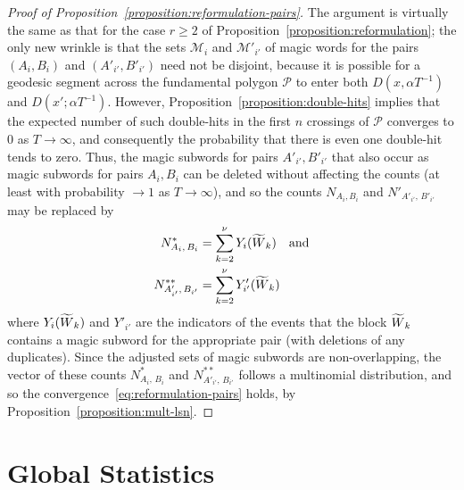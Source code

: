\documentclass[10pt]{amsart}
\theoremstyle{definition}\newtheorem{defi}[theo]{Definition}\newtheorem{rema}[theo]{Remark}\newtheorem{exam}[theo]{Example}\newtheorem{exem}[theo]{Example}\newtheorem{nota}[theo]{Notation}
\let\oldtilde\tilde
\renewcommand*{\tilde}[1]{\mathchoice{\widetilde{#1}}{\widetilde{#1}}{\oldtilde{#1}}{\oldtilde{#1}}}\let\oldforall\forall
\renewcommand*{\forall}{\mathrel{\oldforall}}
\begin{document}
\begin{proof}
[Proof of Proposition~\ref{proposition:reformulation-pairs}]
The argument is virtually the same as that for the case $r\geq 2$ of Proposition~\ref{proposition:reformulation}; the only new wrinkle is that the sets $\mathcal{M}_{i}$ and $\mathcal{M}'_{i'}$ of magic words for the pairs $(A_{i},B_{i})$ and $(A'_{i'},B'_{i'})$ need not be disjoint, because it is possible for a geodesic segment across the fundamental polygon $\mathcal{P}$ to enter both $D (x,\alpha T^{-1})$ and $D (x';\alpha T^{-1})$. However, Proposition~\ref{proposition:double-hits} implies that the expected number of such double-hits in the first $n$ crossings of $\mathcal{P}$ converges to $0$ as $T \rightarrow \infty$, and consequently the probability that there is even one double-hit tends to zero. Thus, the magic subwords for pairs $A'_{i'},B'_{i'}$ that also occur as magic subwords for pairs $A_{i},B_{i}$ can be deleted without affecting the counts (at least with probability $\rightarrow 1$ as $T \rightarrow \infty$), and so the counts $N_{A_{i},B_{i}}$ and $N'_{A'_{i'},\,B'_{i'}}$ may be replaced by
\begin{align*}
N^{*}_{A_{i},\,B_{i}}&=\sum_{k=2}^{\nu} Y_{i} (\tilde{W}_{k}) \quad \text{and}\\
N^{**}_{A'_{i'},\,B_{i'}}&=\sum_{k=2}^{\nu} Y'_{i'} (\tilde{W}_{k})
\end{align*}
where $Y_{i}(\tilde{W}_{k})$ and $Y'_{i'}$ are the indicators of the events that the block $\tilde{W}_{k}$ contains a magic subword for the appropriate pair (with deletions of any duplicates). Since the adjusted sets of magic subwords are non-overlapping, the vector of these counts $N^{*}_{A_{i},\,B_{i}}$ and $N^{**}_{A'_{i'},\,B_{i'}}$ follows a multinomial distribution, and so the convergence~\eqref{eq:reformulation-pairs} holds, by Proposition~\ref{proposition:mult-lsn}.
\end{proof}

\section{Global Statistics}\label{sec:global-stats}
\end{document}

